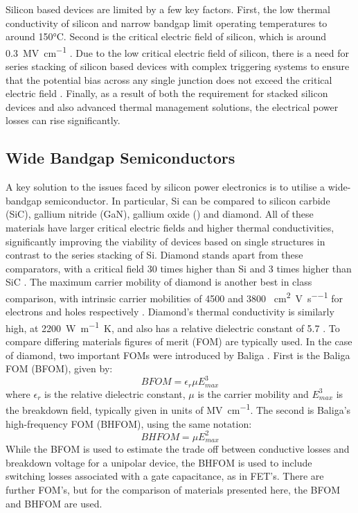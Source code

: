 \begin{refsection}
Silicon based devices are limited by a few key factors. First, the low thermal conductivity of silicon and narrow bandgap limit operating temperatures to around 150\si{\degreeCelsius}. Second is the critical electric field of silicon, which is around 0.3~\si{\mega\volt\per\centi\metre} \cite{McCluskey1996-rz}. Due to the low critical electric field of silicon, there is a need for series stacking of silicon based devices with complex triggering systems to ensure that the potential bias across any single junction does not exceed the critical electric field \cite{ZhiweiLiu2010, Tolbert2005}. Finally, as a result of both the requirement for stacked silicon devices and also advanced thermal management solutions, the electrical power losses can rise significantly.

\subsection{Wide Bandgap Semiconductors}
A key solution to the issues faced by silicon power electronics is to utilise a wide-bandgap semiconductor. In particular, Si can be compared to silicon carbide (SiC), gallium nitride (GaN), gallium oxide () and diamond. All of these materials have larger critical electric fields and higher thermal conductivities, significantly improving the viability of devices based on single structures in contrast to the series stacking of Si. Diamond stands apart from these comparators, with a critical field 30 times higher than Si and 3 times higher than SiC \cite{Zaitsev2010-vd}. The maximum carrier mobility of diamond is another best in class comparison, with intrinsic carrier mobilities of 4500 and 3800 ~\si{\centi\metre\squared\per\volt\per\second} for electrons and holes respectively \cite{Isberg2002}. Diamond's thermal conductivity is similarly high, at 2200~\si{\watt\per\metre\kelvin}, and also has a relative dielectric constant of 5.7 \cite{Zaitsev2010-vd}. To compare differing materials figures of merit (FOM) are typically used. In the case of diamond, two important FOMs were introduced by Baliga \cite{Baliga1989}. First is the Baliga FOM (BFOM), given by:
\begin{equation}
    BFOM = \epsilon_{r}\mu E_{max}^{3}
\end{equation}
where $\epsilon_{r}$ is the relative dielectric constant, $\mu$ is the carrier mobility and $E_{max}^{3}$ is the breakdown field, typically given in units of \si{\mega\volt\per\centi\metre}. The second is Baliga's high-frequency FOM (BHFOM), using the same notation:
\begin{equation}
    BHFOM = \mu E_{max}^{2}
\end{equation}
\noindent While the BFOM is used to estimate the trade off between conductive losses and breakdown voltage for a unipolar device, the BHFOM is used to include switching losses associated with a gate capacitance, as in FET's. There are further FOM's, but for the comparison of materials presented here, the BFOM and BHFOM are used.


\end{refsection}
